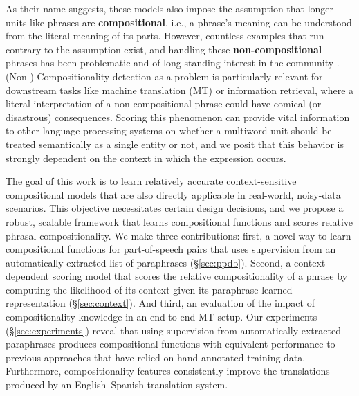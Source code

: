 \documentclass[11pt]{article}
\begin{document}
As their name suggests, these models also impose the assumption that longer units like phrases are \textbf{compositional}, i.e., a phrase's meaning can be understood from the literal meaning of its parts. 
However, countless examples that run contrary to the assumption exist, and handling these \textbf{non-compositional} phrases has been problematic and of long-standing interest in the community \cite{Lin1999,Sag2002}.
(Non-) Compositionality detection as a problem is particularly relevant for downstream tasks like machine translation (MT) or information retrieval, where a literal interpretation of a non-compositional phrase could have comical (or disastrous) consequences. 
Scoring this phenomenon can provide vital information to other language processing systems on whether a multiword unit should be treated semantically as a single entity or not, and we posit that this behavior is strongly dependent on the context in which the expression occurs. 


The goal of this work is to learn relatively accurate context-sensitive compositional models that are also directly applicable in real-world, noisy-data scenarios. 
This objective necessitates certain design decisions, and we propose a robust, scalable framework that learns compositional functions and scores relative phrasal compositionality.  
We make three contributions: first, a novel way to learn compositional functions for part-of-speech pairs that uses supervision from an automatically-extracted list of paraphrases (\S\ref{sec:ppdb}). 
Second, a context-dependent scoring model that scores the relative compositionality of a phrase \cite{McCarthy2003} by computing the likelihood of its context given its paraphrase-learned representation (\S\ref{sec:context}). 
And third, an evaluation of the impact of compositionality knowledge in an end-to-end MT setup.
Our experiments (\S\ref{sec:experiments}) reveal that using supervision from automatically extracted paraphrases produces compositional functions with equivalent performance to previous approaches that have relied on hand-annotated training data. 
Furthermore, compositionality features consistently improve the translations produced by an English--Spanish translation system.
\end{document}
